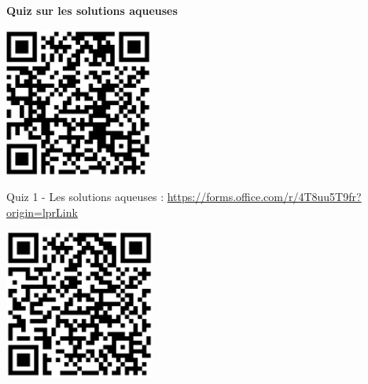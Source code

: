 \documentclass[french, a4paper, 12pt, twocolumn, landscape]{article}
\begin{document}
\vspace{1cm}
	\noindent \textbf{Quiz sur les solutions aqueuses}
\begin{center}
	\begin{minipage}{.12\textwidth}
		\centering
		\includegraphics[width=.5\textwidth]{Quiz1.png}
		
		Quiz 1 - Les solutions aqueuses : \url{https://forms.office.com/r/4T8uu5T9fr?origin=lprLink}
	\end{minipage}\hspace{.5cm}
	\begin{minipage}{.12\textwidth}
		\centering
		\includegraphics[width=.5\textwidth]{Quiz2.png}


\end{minipage}
\end{center}
\end{document}
